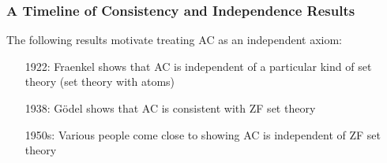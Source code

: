 \begin{frame}
\frametitle{A Timeline of Consistency and Independence Results}

The following results motivate treating AC as an independent axiom: %

\begin{itemize}[<+->]

\item[1922:] Fraenkel shows that AC is independent of a particular kind of set theory (set theory with atoms)




\item[1938:] G\"odel shows that AC is consistent with ZF set theory


\item[1950s:] Various people come close to showing AC is independent of ZF set theory


\end{itemize}
\end{frame}
